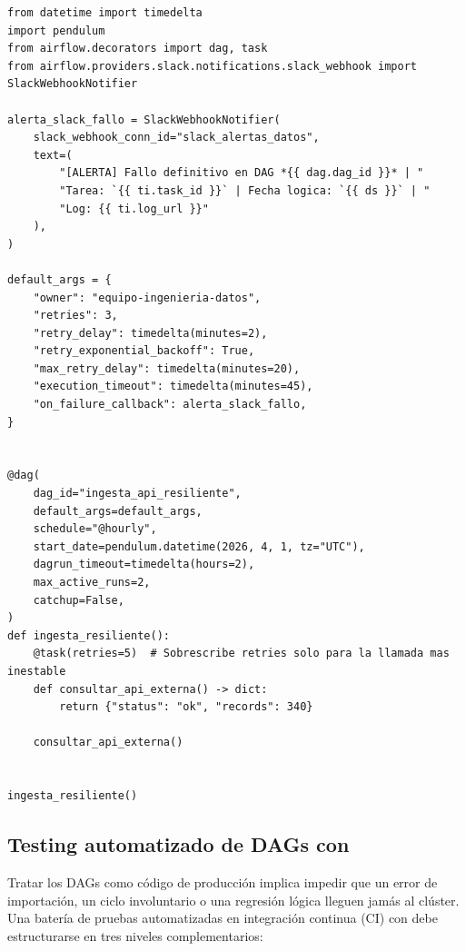 \begin{lstlisting}[style=python, caption={Configuración defensiva de \code{default\_args}, \textit{backoff} exponencial, \textit{timeouts} y \textit{Notifiers}.}, label={lst:resiliencia-errores}]
from datetime import timedelta
import pendulum
from airflow.decorators import dag, task
from airflow.providers.slack.notifications.slack_webhook import SlackWebhookNotifier

alerta_slack_fallo = SlackWebhookNotifier(
    slack_webhook_conn_id="slack_alertas_datos",
    text=(
        "[ALERTA] Fallo definitivo en DAG *{{ dag.dag_id }}* | "
        "Tarea: `{{ ti.task_id }}` | Fecha logica: `{{ ds }}` | "
        "Log: {{ ti.log_url }}"
    ),
)

default_args = {
    "owner": "equipo-ingenieria-datos",
    "retries": 3,
    "retry_delay": timedelta(minutes=2),
    "retry_exponential_backoff": True,
    "max_retry_delay": timedelta(minutes=20),
    "execution_timeout": timedelta(minutes=45),
    "on_failure_callback": alerta_slack_fallo,
}


@dag(
    dag_id="ingesta_api_resiliente",
    default_args=default_args,
    schedule="@hourly",
    start_date=pendulum.datetime(2026, 4, 1, tz="UTC"),
    dagrun_timeout=timedelta(hours=2),
    max_active_runs=2,
    catchup=False,
)
def ingesta_resiliente():
    @task(retries=5)  # Sobrescribe retries solo para la llamada mas inestable
    def consultar_api_externa() -> dict:
        return {"status": "ok", "records": 340}

    consultar_api_externa()


ingesta_resiliente()
\end{lstlisting}

\subsection{Testing automatizado de DAGs con \texorpdfstring{}{pytest}}

Tratar los DAGs como código de producción implica impedir que un error de importación, un ciclo involuntario o una regresión lógica lleguen jamás al clúster. Una batería de pruebas automatizadas en integración continua (CI) con  debe estructurarse en tres niveles complementarios:

